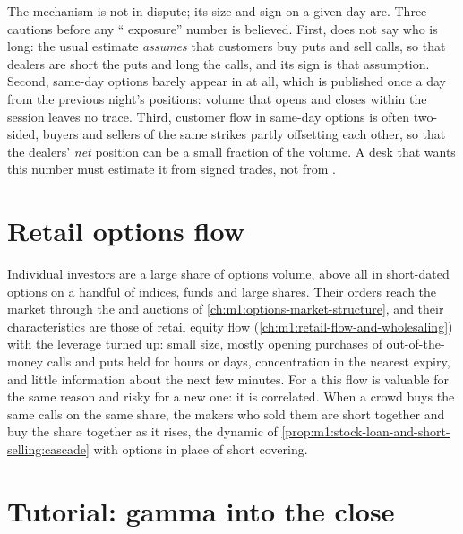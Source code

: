 The mechanism is not in dispute; its size and sign on a given day are. Three
cautions before any `` exposure'' number is believed. First,  does not say who is long: the usual estimate \emph{assumes} that
customers buy puts and sell calls, so that dealers are short the puts and
long the calls, and its sign is that assumption. Second, same-day options
barely appear in  at all, which is published once a day from the
previous night's positions: volume that opens and closes within the session
leaves no trace. Third, customer flow in same-day options is often two-sided,
buyers and sellers of the same strikes partly offsetting each other, so that the
dealers' \emph{net} position can be a small fraction of the volume. A desk that
wants this number must estimate it from signed trades, not from .

\section{Retail options flow}

Individual investors are a large share of options volume, above all in
short-dated options on a handful of indices, funds and large shares. Their
orders reach the market through the  and auctions of
\cref{ch:m1:options-market-structure}, and their characteristics are those of
retail equity flow (\cref{ch:m1:retail-flow-and-wholesaling}) with the
leverage turned up: small size, mostly opening purchases of out-of-the-money
calls and puts held for hours or days, concentration in the nearest expiry,
and little information about the next few minutes. For a  this
flow is valuable for the same reason and risky for a new one: it is
correlated. When a crowd buys the same calls on the same share, the makers
who sold them are short  together and buy the share together as it
rises, the dynamic of
\cref{prop:m1:stock-loan-and-short-selling:cascade} with options in place of
short covering.

\section{Tutorial: gamma into the close}\label{tut:m1:zero-day-options-and-retail-flow:gamma}

